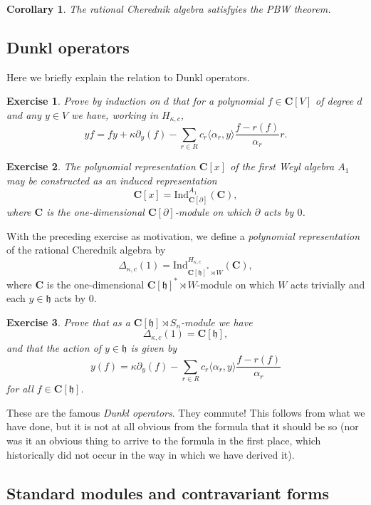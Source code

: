 \documentclass[12pt, reqno]{amsart}
\numberwithin{equation}{section}
\theoremstyle{definition}
\theoremstyle{plain}
\newtheorem{corollary}[theorem]{Corollary}
\newtheorem{exercise}{Exercise}
\newcommand{\CC}{\mathbf{C}}
\newcommand{\hh}{\mathfrak{h}}
\newcommand{\la}{\langle}
\newcommand{\ra}{\rangle}
\begin{document}
\begin{corollary}
The rational Cherednik algebra satisfyies the PBW theorem.	
\end{corollary}

\subsection{Dunkl operators}

Here we briefly explain the relation to Dunkl operators. 
\begin{exercise}
Prove by induction on $d$ that for a polynomial $f \in \CC[V]$ of degree $d$ and any $y \in V$ we have, working in $H_{\kappa,c}$,
$$yf=fy+\kappa \partial_y(f)-\sum_{r \in R} c_r \la \alpha_r, y \ra \frac{f-r(f)}{\alpha_r} r.$$
\end{exercise}

\begin{exercise} The polynomial representation $\CC[x]$ of the first Weyl algebra $A_1$ may be constructed as an induced representation
$$\CC[x]=\mathrm{Ind}_{\CC[\partial]}^{A_1}(\CC),$$ where $\CC$ is the one-dimensional $\CC[\partial]$-module on which $\partial$ acts by $0$.
\end{exercise}

With the preceding exercise as motivation, we define a \emph{polynomial representation} of the rational Cherednik algebra by
$$\Delta_{\kappa,c}(1)=\mathrm{Ind}_{\CC[\hh]^* \rtimes W}^{H_{\kappa,c}}(\CC),$$ where $\CC$ is the one-dimensional $\CC[\hh]^* \rtimes W$-module on which $W$ acts trivially and each $y \in \hh$ acts by $0$.
\begin{exercise}
Prove that as a $\CC[\hh] \rtimes S_n$-module we have
$$\Delta_{\kappa,c}(1)=\CC[\hh],$$ and that the action of $y \in \hh$ is given by
$$y(f)=\kappa \partial_y(f)-\sum_{r \in R} c_r \la \alpha_r,y \ra \frac{f-r(f)}{\alpha_r}$$ for all $f \in \CC[\hh]$. 
\end{exercise} These are the famous \emph{Dunkl operators}. They commute! This follows from what we have done, but it is not at all obvious from the formula that it should be so (nor was it an obvious thing to arrive to the formula in the first place, which historically did not occur in the way in which we have derived it).

\subsection{Standard modules and contravariant forms}
\end{document}

